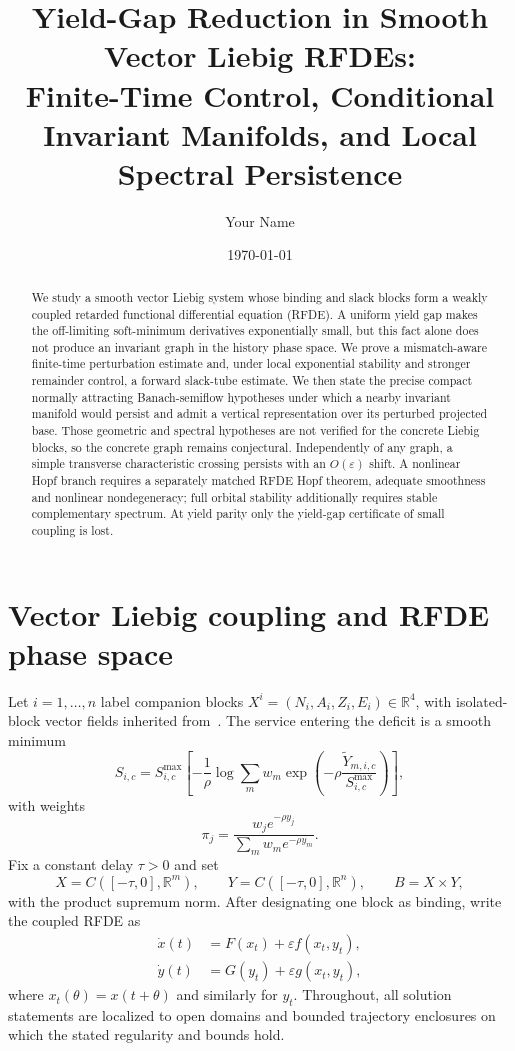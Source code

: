 \documentclass[11pt]{article}
\title{Yield-Gap Reduction in Smooth Vector Liebig RFDEs:\\Finite-Time Control, Conditional Invariant Manifolds, and Local Spectral Persistence}
\author{Your Name}
\date{\today}
\theoremstyle{definition}
\theoremstyle{remark}
\begin{document}
\maketitle

\begin{abstract}
We study a smooth vector Liebig system whose binding and slack blocks form a weakly coupled retarded functional differential equation (RFDE). A uniform yield gap makes the off-limiting soft-minimum derivatives exponentially small, but this fact alone does not produce an invariant graph in the history phase space. We prove a mismatch-aware finite-time perturbation estimate and, under local exponential stability and stronger remainder control, a forward slack-tube estimate. We then state the precise compact normally attracting Banach-semiflow hypotheses under which a nearby invariant manifold would persist and admit a vertical representation over its perturbed projected base. Those geometric and spectral hypotheses are not verified for the concrete Liebig blocks, so the concrete graph remains conjectural. Independently of any graph, a simple transverse characteristic crossing persists with an $O(\varepsilon)$ shift. A nonlinear Hopf branch requires a separately matched RFDE Hopf theorem, adequate smoothness and nonlinear nondegeneracy; full orbital stability additionally requires stable complementary spectrum. At yield parity only the yield-gap certificate of small coupling is lost.
\end{abstract}

\section{Vector Liebig coupling and RFDE phase space}
\label{sec:object}

Let $i=1,\dots,n$ label companion blocks $X^i=(N_i,A_i,Z_i,E_i)\in\mathbb R^4$, with isolated-block vector fields inherited from~\cite{paperI}. The service entering the deficit is a smooth minimum
\[
S_{i,c}=S_{i,c}^{\max}\left[-\frac1\rho
\log\sum_m w_m\exp\left(-\rho\frac{\widetilde Y_{m,i,c}}{S_{i,c}^{\max}}\right)\right],
\]
with weights
\[
\pi_j=\frac{w_j e^{-\rho y_j}}{\sum_m w_m e^{-\rho y_m}}.
\]
Fix a constant delay $\tau>0$ and set
\[
X=C([ -\tau,0],\mathbb R^m),\qquad
Y=C([ -\tau,0],\mathbb R^n),\qquad
B=X\times Y,
\]
with the product supremum norm. After designating one block as binding, write the coupled RFDE as
\begin{equation}
\begin{aligned}
\dot x(t)&=F(x_t)+\varepsilon f(x_t,y_t),\\
\dot y(t)&=G(y_t)+\varepsilon g(x_t,y_t),
\end{aligned}
\label{eq:split}
\end{equation}
where $x_t(\theta)=x(t+\theta)$ and similarly for $y_t$. Throughout, all solution statements are localized to open domains and bounded trajectory enclosures on which the stated regularity and bounds hold.
\end{document}
